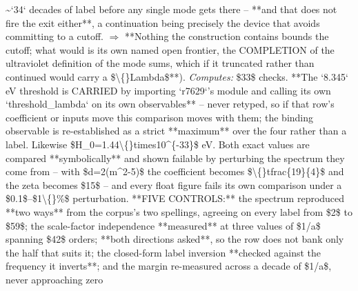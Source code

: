 \begin{description}
\textasciitilde{}`34` decades of label before any single mode gets there --  **and that does not fire the exit either**, a continuation being precisely the device that avoids committing to a cutoff. \ensuremath{\Rightarrow} **Nothing the construction contains bounds the cutoff; what would is its own named open frontier, the COMPLETION of the ultraviolet definition of the mode sums, which if it truncated rather than continued would carry a \$\textbackslash\{\}Lambda\$**). 
\emph{Computes:} \$33\$ checks. **The `8.345` eV threshold is CARRIED by importing `r7629`'s module and calling its own `threshold\_lambda` on its own observables** -- never retyped, so if that row's coefficient or inputs move this comparison moves with them; the binding observable is re-established as a strict **maximum** over the four rather than a label. Likewise \$H\_0=1.44\textbackslash\{\}times10\textasciicircum{}\{-33\}\$ eV. Both exact values are compared **symbolically** and shown failable by perturbing the spectrum they come from -- with \$d=2(m\textasciicircum{}2-5)\$ the coefficient becomes \$\textbackslash\{\}tfrac\{19\}\{4\}\$ and the zeta becomes \$15\$ -- and every float figure fails its own comparison under a \$0.1\$--\$1\textbackslash\{\}\%\$ perturbation. **FIVE CONTROLS:** the spectrum reproduced **two ways** from the corpus's two spellings, agreeing on every label from \$2\$ to \$59\$; the scale-factor independence **measured** at three values of \$1/a\$ spanning \$42\$ orders; **both directions asked**, so the row does not bank only the half that suits it; the closed-form label inversion **checked against the frequency it inverts**; and the margin re-measured across a decade of \$1/a\$, never approaching zero

\end{description}
